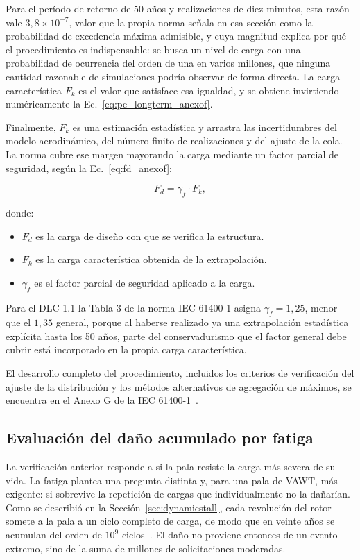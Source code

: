 Para el período de retorno de $50$ años y realizaciones de diez minutos, esta razón vale $3{,}8 \times 10^{-7}$, valor que la propia norma señala en esa sección como la probabilidad de excedencia máxima admisible, y cuya magnitud explica por qué el procedimiento es indispensable: se busca un nivel de carga con una probabilidad de ocurrencia del orden de una en varios millones, que ninguna cantidad razonable de simulaciones podría observar de forma directa. La carga característica $F_k$ es el valor que satisface esa igualdad, y se obtiene invirtiendo numéricamente la Ec.~\ref{eq:pe_longterm_anexof}.

Finalmente, $F_k$ es una estimación estadística y arrastra las incertidumbres del modelo aerodinámico, del número finito de realizaciones y del ajuste de la cola. La norma cubre ese margen mayorando la carga mediante un factor parcial de seguridad, según la Ec.~\ref{eq:fd_anexof}:

\begin{equation}
F_d = \gamma_f \cdot F_k,
\label{eq:fd_anexof}
\end{equation}

donde:
\begin{itemize}
    \item $F_d$ es la carga de diseño con que se verifica la estructura.
    \item $F_k$ es la carga característica obtenida de la extrapolación.
    \item $\gamma_f$ es el factor parcial de seguridad aplicado a la carga.
\end{itemize}

Para el DLC 1.1 la Tabla 3 de la norma IEC 61400-1 asigna $\gamma_f = 1{,}25$, menor que el $1{,}35$ general, porque al haberse realizado ya una extrapolación estadística explícita hasta los 50 años, parte del conservadurismo que el factor general debe cubrir está incorporado en la propia carga característica.

El desarrollo completo del procedimiento, incluidos los criterios de verificación del ajuste de la distribución y los métodos alternativos de agregación de máximos, se encuentra en el Anexo G de la IEC 61400-1~\parencite*{IEC61400-1}.

\subsection{Evaluación del daño acumulado por fatiga}
\label{sec:anexo_g_antecedentes}

La verificación anterior responde a si la pala resiste la carga más severa de su vida. La fatiga plantea una pregunta distinta y, para una pala de VAWT, más exigente: si sobrevive la repetición de cargas que individualmente no la dañarían. Como se describió en la Sección~\ref{sec:dynamicstall}, cada revolución del rotor somete a la pala a un ciclo completo de carga, de modo que en veinte años se acumulan del orden de $10^9$ ciclos~\parencite{Sutherland2012}. El daño no proviene entonces de un evento extremo, sino de la suma de millones de solicitaciones moderadas.

